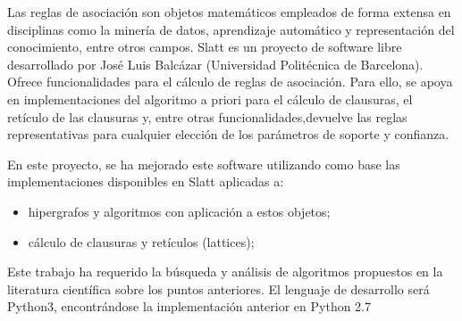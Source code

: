 Las reglas de asociación son objetos matemáticos empleados de forma extensa en disciplinas como la minería de datos, aprendizaje automático y representación del conocimiento, entre otros campos.
Slatt es un proyecto de software libre desarrollado por José Luis Balcázar (Universidad Politécnica de Barcelona). Ofrece funcionalidades para el cálculo de reglas de asociación. Para ello, se apoya en implementaciones del algoritmo a priori para el cálculo de clausuras, el retículo de las clausuras y, entre otras
funcionalidades,devuelve las reglas representativas para cualquier elección de los parámetros de soporte y confianza.

En este proyecto, se ha mejorado este software utilizando como base las implementaciones disponibles en Slatt aplicadas a:

\begin{itemize}
    \item hipergrafos y algoritmos con aplicación a estos objetos;
    
    \item cálculo de clausuras y retículos (lattices);
\end{itemize}


Este trabajo ha requerido la búsqueda y análisis de algoritmos propuestos en la literatura científica sobre los puntos anteriores.
El lenguaje de desarrollo será Python3, encontrándose la implementación anterior en Python 2.7
%
%



